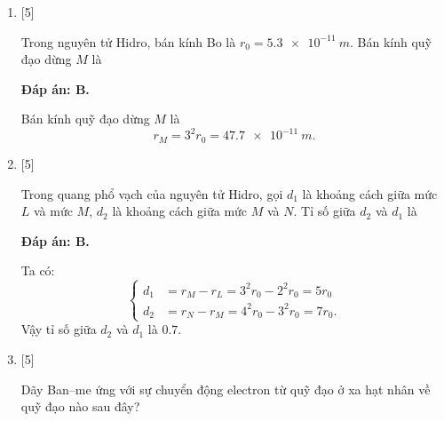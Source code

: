 \begin{enumerate}[label=\bfseries Câu \arabic*:]
	\item {} [5]
	\cauhoi
	{Trong nguyên tử Hidro, bán kính Bo là $ r_{0} = \SI{5,3e-11}{m} $. Bán kính quỹ đạo dừng $ M $ là
	}
	
	\loigiai
	{		\textbf{Đáp án: B.}
		
		Bán kính quỹ đạo dừng $ M $ là
		\begin{equation*}
			r_{M} = 3^{2} r_{0} = \SI{47,7e-11}{m}.
		\end{equation*}
	}
	
	\item {} [5]
	\cauhoi
	{Trong quang phổ vạch của nguyên tử Hidro, gọi $ d_{1} $ là khoảng cách giữa mức $ L $ và mức $ M $, $ d_{2} $ là khoảng cách giữa mức $ M $ và $ N $. Tỉ số giữa $ d_{2} $ và $ d_{1} $ là 
	}
	
	\loigiai
	{		\textbf{Đáp án: B.}
		
		Ta có:
		$$
		\left\{
		\begin{aligned}
			d_{1} &= r_{M} - r_{L} = 3^{2} r_{0} - 2^{2} r_{0} = 5 r_{0} \\
			d_{2} &= r_{N} - r_{M} = 4^{2} r_{0} - 3^{2} r_{0} = 7 r_{0}.
		\end{aligned}
		\right.
		$$
		Vậy tỉ số giữa $ d_{2} $ và $ d_{1} $ là $ \num{0,7}. $
	}
	
	\item {} [5]
	\cauhoi
	{Dãy Ban–me ứng với sự chuyển động electron từ quỹ đạo ở xa hạt nhân về quỹ đạo nào sau đây?
	}
	

\end{enumerate}
